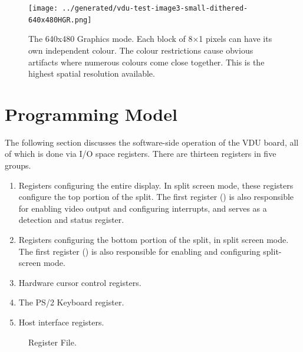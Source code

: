   
  \begin{figure}
    \centering
    \texttt{[image: ../generated/vdu-test-image3-small-dithered-640x480HGR.png]}%
    \caption[640×480 Graphics mode]{\label{fig:vdu:mode-640x480hgr}The 640x480 Graphics mode.
      Each block of 8×1 pixels can have its own independent colour.
      The colour restrictions cause obvious artifacts where numerous colours come close together.
      This is the highest spatial resolution available.
    }
  \end{figure}

\else


\fi




\section{Programming Model}

The following section discusses the software-side operation of the VDU board,
all of which is done via I/O space registers. There are thirteen registers in five groups.

\begin{enumerate}
  \item Registers configuring the entire display. In split screen mode, these
    registers configure the top portion of the split. The first register
    () is also responsible for enabling video output and configuring
    interrupts, and serves as a detection and status register.
  \item Registers configuring the bottom portion of the split, in split screen
    mode. The first register () is also responsible for enabling and
    configuring split-screen mode.
  \item Hardware cursor control registers.
  \item The PS/2 Keyboard register.
  \item Host interface registers.
\end{enumerate}



\begin{figure}
 \centering
 \caption[Register File]{\label{fig:vdu-register-file} Register File.}
\end{figure}




